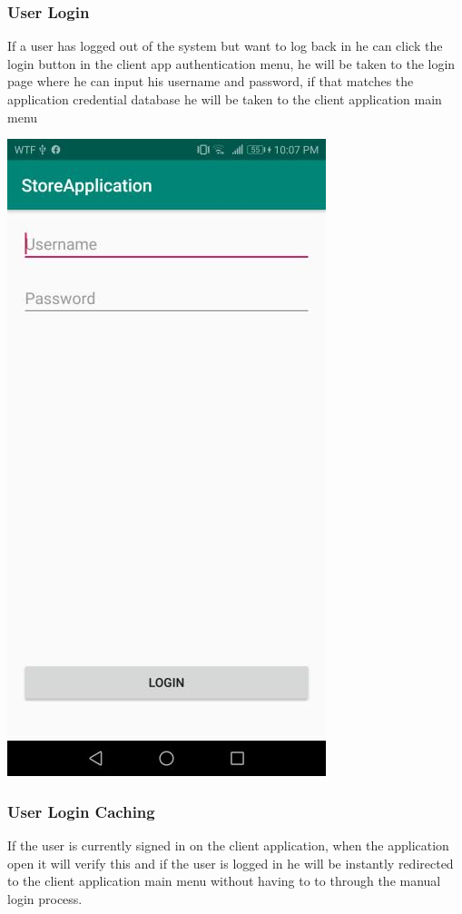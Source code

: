 \documentclass[12pt]{article}
\begin{document}
\subsubsection{User Login}
\hspace{0.6cm}
If a user has logged out of the system but want to log back in he can click the login button in the client app
authentication menu, he will be taken to the login page where he can input his username and password, if that
matches the application credential database he will be taken to the client application main menu

\begin{center}
\includegraphics[width=0.3\linewidth]{Images/Client/ClientLogin.jpg}
\end{center}

\subsubsection{User Login Caching}
\hspace{0.6cm}
If the user is currently signed in on the client application, when the application open it will verify this and
if the user is logged in he will be instantly redirected to the client application main menu without having to
to through the manual login process.
\end{document}
